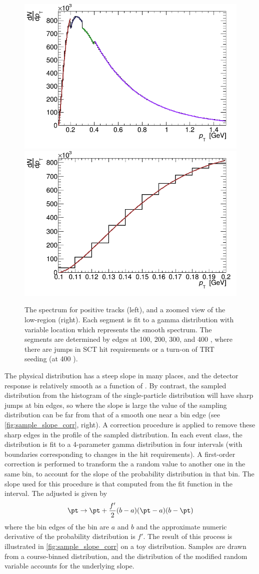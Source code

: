 \begin{figure}[t]
\centering
\includegraphics[width=.49\linewidth]{pos_pt.png}
\includegraphics[width=.49\linewidth]{pos_pt_zoom_bin.png}\\
\caption{The \pt spectrum for positive tracks (left), and a zoomed view of the low-\pt region (right). Each segment is fit to a gamma distribution with variable location which represents the smooth spectrum. The segments are determined by edges at 100, 200, 300, and 400 \MeV, where there are jumps in SCT hit requirements or a turn-on of TRT seeding (at 400 \MeV).}
\label{fig:pt_fits}
\end{figure}

\FloatBarrier

The physical \pt distribution has a steep slope in many places, and the detector response is relatively smooth as a function of \pt.
By contrast, the sampled distribution from the histogram of the single-particle distribution will have sharp jumps at bin edges, so where the slope is large the value of the sampling distribution can be far from that of a smooth one near a bin edge (see \cref{fig:sample_slope_corr}, right).
A correction procedure is applied to remove these sharp edges in the \pt profile of the sampled distribution. In each event class, the \pt distribution is fit to a 4-parameter gamma distribution in four intervals (with boundaries corresponding to changes in the \sct hit requirements).
A first-order correction is performed to transform the a random \pt value to another one in the same bin, to account for the slope of the probability distribution in that bin.
The slope used for this procedure is that computed from the fit function in the \pt interval.
The adjusted \pt is given by
\begin{equation}
  \pt \rightarrow \pt + \frac{f'}{2} (b-a) (\pt-a) (b-\pt)
\end{equation}
where the bin edges of the \pt bin are $a$ and $b$ and the approximate numeric derivative of the probability distribution is $f'$.
The result of this process is illustrated in \cref{fig:sample_slope_corr} on a toy distribution.
Samples are drawn from a course-binned distribution, and the distribution of the modified random variable accounts for the underlying slope.

